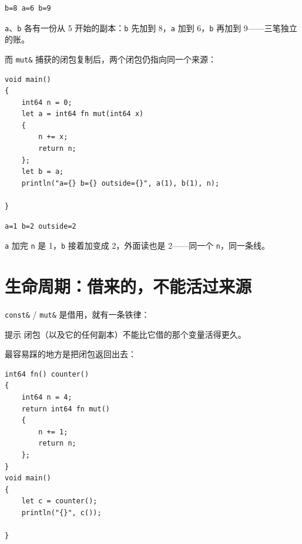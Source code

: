 \par
\medskip
\begin{lstlisting}[style=out]
b=8 a=6 b=9
\end{lstlisting}
\par
\medskip

\texttt{a}、\texttt{b} 各有一份从 5 开始的副本：\texttt{b} 先加到 8，\texttt{a} 加到 6，\texttt{b} 再加到 9——三笔独立的账。

而 \texttt{mut\&} 捕获的闭包复制后，两个闭包仍指向同一个来源：

\par
\medskip
\begin{lstlisting}[style=chali]
void main()
{
    int64 n = 0;
    let a = int64 fn mut(int64 x)
    {
        n += x;
        return n;
    };
    let b = a;
    println("a={} b={} outside={}", a(1), b(1), n);

}
\end{lstlisting}
\par
\medskip

\par
\medskip
\begin{lstlisting}[style=out]
a=1 b=2 outside=2
\end{lstlisting}
\par
\medskip

\texttt{a} 加完 \texttt{n} 是 1，\texttt{b} 接着加变成 2，外面读也是 2——同一个 \texttt{n}，同一条线。

\section{生命周期：借来的，不能活过来源}

\texttt{const\&} / \texttt{mut\&} 是借用，就有一条铁律：

\begin{tip}{提示}
闭包（以及它的任何副本）不能比它借的那个变量活得更久。
\end{tip}

最容易踩的地方是把闭包返回出去：

\par
\medskip
\begin{lstlisting}[style=chali]
int64 fn() counter()
{
    int64 n = 4;
    return int64 fn mut()
    {
        n += 1;
        return n;
    };
}
void main()
{
    let c = counter();
    println("{}", c());

}
\end{lstlisting}
\par
\medskip

